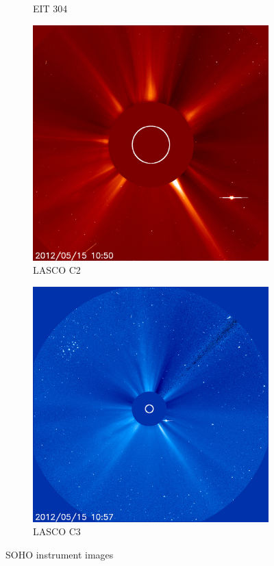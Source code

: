 \documentclass{article}
\begin{document}
\begin{figure}[h!tb]
\begin{subfigure}[b]{0.16\linewidth}
		\caption{EIT 304}
		\label{fig:SOHOEIT304}
	\end{subfigure}
	\begin{subfigure}[b]{0.16\linewidth}
		\includegraphics[width=\textwidth]{Figures/SOHOLASCOC2.jpg}
		\caption{LASCO C2}
		\label{fig:SOHOLASCOC2}
	\end{subfigure}
	\begin{subfigure}[b]{0.16\linewidth}
		\includegraphics[width=\textwidth]{Figures/SOHOLASCOC3.jpg}
		\caption{LASCO C3}
		\label{fig:SOHOLASCOC3}
	\end{subfigure}
	\caption{SOHO instrument images}
	\label{fig:SOHO}
\end{figure}
\end{document}
